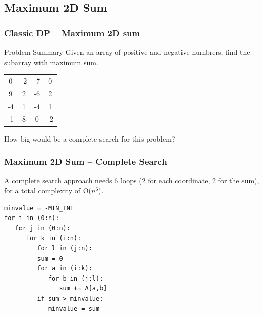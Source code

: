 \documentclass{beamer}
\begin{document}
\subsection{Maximum 2D Sum}
\begin{frame}
  \frametitle{Classic DP -- Maximum 2D sum}
  \begin{block}{Problem Summary}
    Given an array of positive and negative numbrers, find the
    subarray with maximum sum.
  \end{block}

  \bigskip

  \begin{center}
    \begin{tabular}{|cccc|}
      \hline
      0 & -2 & -7 & 0\\
      9 & 2 & -6 & 2\\
      -4 & 1 & -4 & 1\\
      -1 & 8 & 0 & -2\\
      \hline
    \end{tabular}
  \end{center}

  \bigskip

  How big would be a complete search for this problem?
\end{frame}

\begin{frame}[fragile]
  \frametitle{Maximum 2D Sum -- Complete Search}

\begin{block}{}
  A complete search approach needs 6 loops (2 for each coordinate, 2
  for the sum), for a total complexity of O($n^6$).
\end{block}

\begin{block}{}
{\smaller
\begin{verbatim}
minvalue = -MIN_INT
for i in (0:n):
   for j in (0:n):
      for k in (i:n):
         for l in (j:n):
         sum = 0
         for a in (i:k):
            for b in (j:l):
               sum += A[a,b]
         if sum > minvalue:
            minvalue = sum
\end{verbatim}
}
\end{block}
\end{frame}
\end{document}
